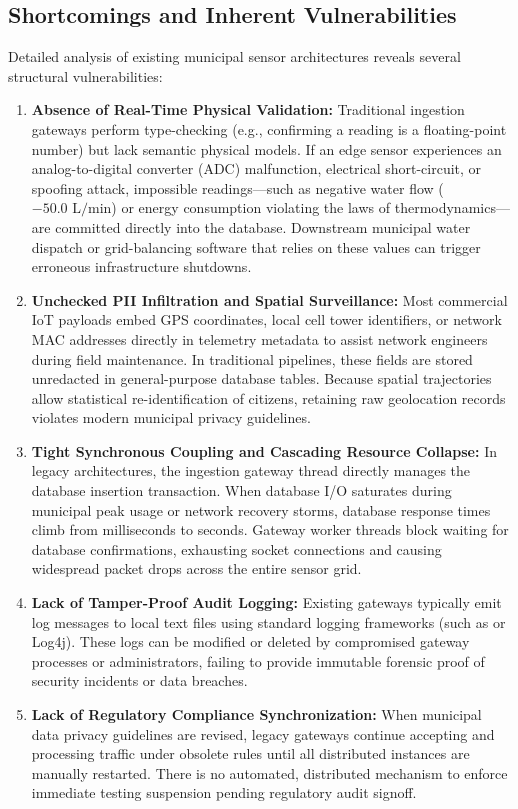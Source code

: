 \documentclass[a4paper]{article}
\begin{document}
\subsection{Shortcomings and Inherent Vulnerabilities}
Detailed analysis of existing municipal sensor architectures reveals several structural vulnerabilities:
\begin{enumerate}[label=\textbf{\arabic*.}]
    \item \textbf{Absence of Real-Time Physical Validation:} Traditional ingestion gateways perform type-checking (e.g., confirming a reading is a floating-point number) but lack semantic physical models. If an edge sensor experiences an analog-to-digital converter (ADC) malfunction, electrical short-circuit, or spoofing attack, impossible readings---such as negative water flow ($-50.0\text{ L/min}$) or energy consumption violating the laws of thermodynamics---are committed directly into the database. Downstream municipal water dispatch or grid-balancing software that relies on these values can trigger erroneous infrastructure shutdowns.
    \item \textbf{Unchecked PII Infiltration and Spatial Surveillance:} Most commercial IoT payloads embed GPS coordinates, local cell tower identifiers, or network MAC addresses directly in telemetry metadata to assist network engineers during field maintenance. In traditional pipelines, these fields are stored unredacted in general-purpose database tables. Because spatial trajectories allow statistical re-identification of citizens, retaining raw geolocation records violates modern municipal privacy guidelines.
    \item \textbf{Tight Synchronous Coupling and Cascading Resource Collapse:} In legacy architectures, the ingestion gateway thread directly manages the database insertion transaction. When database I/O saturates during municipal peak usage or network recovery storms, database response times climb from milliseconds to seconds. Gateway worker threads block waiting for database confirmations, exhausting socket connections and causing widespread packet drops across the entire sensor grid.
    \item \textbf{Lack of Tamper-Proof Audit Logging:} Existing gateways typically emit log messages to local text files using standard logging frameworks (such as  or Log4j). These logs can be modified or deleted by compromised gateway processes or administrators, failing to provide immutable forensic proof of security incidents or data breaches.
    \item \textbf{Lack of Regulatory Compliance Synchronization:} When municipal data privacy guidelines are revised, legacy gateways continue accepting and processing traffic under obsolete rules until all distributed instances are manually restarted. There is no automated, distributed mechanism to enforce immediate testing suspension pending regulatory audit signoff.
\end{enumerate}
\end{document}
